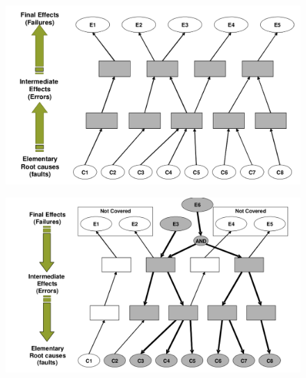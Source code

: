 \begin{figure}
  \centering
  \begin{minipage}{0.49\textwidth}
    \centering
    \includegraphics[width=\textwidth]{images/fmea.png}
    \label{fig:fmea}
  \end{minipage}%
  \begin{minipage}{0.49\textwidth}
    \centering
    \includegraphics[width=\textwidth]{images/fta.png}
    \label{fig:fta}
  \end{minipage}
\end{figure}

